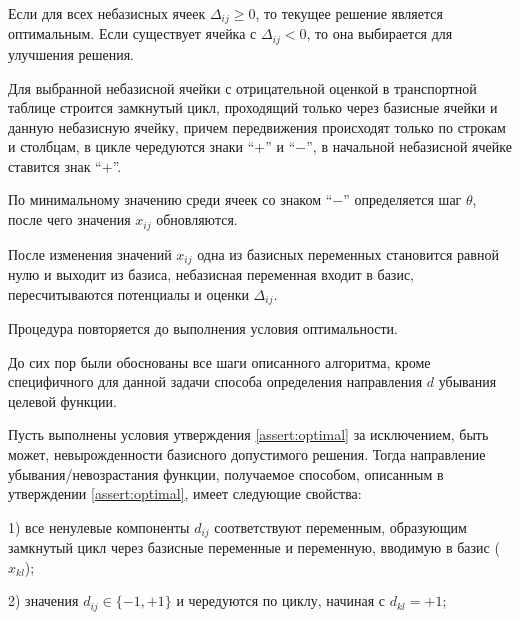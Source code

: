\documentclass[12pt]{article}
\theoremstyle{definition}
\theoremstyle{plain}
\theoremstyle{definition}
\begin{document}
Если для всех небазисных ячеек $\Delta_{ij} \ge 0$,
то текущее решение является оптимальным. Если существует ячейка с $\Delta_{ij} < 0$,
то она выбирается для улучшения решения.

Для выбранной небазисной ячейки с отрицательной оценкой
в транспортной таблице строится замкнутый цикл,
проходящий только через базисные ячейки и данную небазисную ячейку,
причем передвижения происходят только по строкам и столбцам, в цикле чередуются знаки
``$+$'' и ``$-$'', в начальной небазисной ячейке ставится знак ``$+$''.

По минимальному значению среди ячеек со знаком ``$-$''
определяется шаг $\theta$,
после чего значения $x_{ij}$ обновляются.

После изменения значений $x_{ij}$ одна из базисных переменных
становится равной нулю и выходит из базиса, небазисная переменная входит в
базис, пересчитываются потенциалы и оценки $\Delta_{ij}$.

Процедура повторяется до выполнения условия оптимальности.

До сих пор были обоснованы все шаги описанного алгоритма, кроме специфичного
для данной задачи способа определения направления
$d$ убывания целевой функции.

\begin{corollarylocal}\label{assert:altern}
Пусть выполнены условия утверждения \ref{assert:optimal} за исключением,
быть может, невырожденности базисного допустимого решения. Тогда направление убывания/невозрастания
функции, получаемое способом, описанным в утверждении \ref{assert:optimal},
имеет следующие свойства:

1) все ненулевые компоненты $d_{ij}$ соответствуют переменным, образующим
замкнутый цикл через базисные переменные и переменную, вводимую в базис ($x_{kl}$);

2) значения $d_{ij} \in \{-1, +1\}$ и чередуются по циклу, начиная с $d_{kl} = +1$;
\end{corollarylocal}
\end{document}
